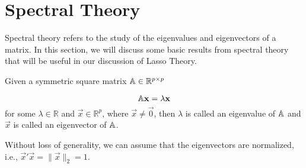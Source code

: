 \section{Spectral Theory}
\label{sec:spectral-theory}

Spectral theory refers to the study of the eigenvalues and eigenvectors of a matrix. In this section, we will discuss some basic results from spectral theory that will be useful in our discussion of Lasso Theory.

\begin{Def}
    Given a symmetric square matrix $\mathbb{A} \in \mathbb{R}^{p \times p}$

    \[
        \mathbb{A}\mathbf{x} = \lambda \mathbf{x}
    \]
    for some $\lambda \in \mathbb{R}$ and $\Vec{x} \in \mathbb{R}^p$, where $\Vec{x} \neq \Vec{0}$, then $\lambda$ is called an eigenvalue of $\mathbb{A}$ and $\Vec{x}$ is called an eigenvector of $\mathbb{A}$.

    Without loss of generality, we can assume that the eigenvectors are normalized, i.e., $\Vec{x}'\Vec{x} = \|\Vec{x}\|_2 = 1$.
\end{Def}

